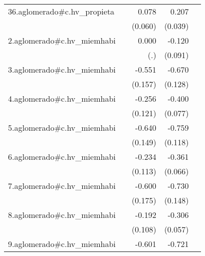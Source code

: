 {\begin{longtable}{l*{4}{D{.}{.}{-1}}}
\addlinespace
36.aglomerado#c.hv\_propieta&                     &       0.078         &       0.207\sym{***}&                     \\
            &                     &     (0.060)         &     (0.039)         &                     \\
\addlinespace
2.aglomerado#c.hv\_miemhabi&                     &       0.000         &      -0.120         &                     \\
            &                     &         (.)         &     (0.091)         &                     \\
\addlinespace
3.aglomerado#c.hv\_miemhabi&                     &      -0.551\sym{***}&      -0.670\sym{***}&                     \\
            &                     &     (0.157)         &     (0.128)         &                     \\
\addlinespace
4.aglomerado#c.hv\_miemhabi&                     &      -0.256\sym{*}  &      -0.400\sym{***}&                     \\
            &                     &     (0.121)         &     (0.077)         &                     \\
\addlinespace
5.aglomerado#c.hv\_miemhabi&                     &      -0.640\sym{***}&      -0.759\sym{***}&                     \\
            &                     &     (0.149)         &     (0.118)         &                     \\
\addlinespace
6.aglomerado#c.hv\_miemhabi&                     &      -0.234\sym{*}  &      -0.361\sym{***}&                     \\
            &                     &     (0.113)         &     (0.066)         &                     \\
\addlinespace
7.aglomerado#c.hv\_miemhabi&                     &      -0.600\sym{***}&      -0.730\sym{***}&                     \\
            &                     &     (0.175)         &     (0.148)         &                     \\
\addlinespace
8.aglomerado#c.hv\_miemhabi&                     &      -0.192         &      -0.306\sym{***}&                     \\
            &                     &     (0.108)         &     (0.057)         &                     \\
\addlinespace
9.aglomerado#c.hv\_miemhabi&                     &      -0.601\sym{***}&      -0.721\sym{***}&                     \\

\end{longtable}}
